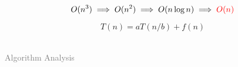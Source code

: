 
\begin{frame}{}

  \pause
  \[
    O(n^3) \implies O(n^2) \implies O(n \log n) \implies \textcolor{red}{O(n)}
  \]
\end{frame}

\begin{frame}{}
  \[
    T(n) = aT(n/b) + f(n)
  \]

  \pause
  \vspace{0.80cm}
  \begin{center}
     \\[10pt]  \pause
    \textcolor{gray}{Algorithm Analysis} \\[10pt] \pause
      \pause
  \end{center}
\end{frame}
